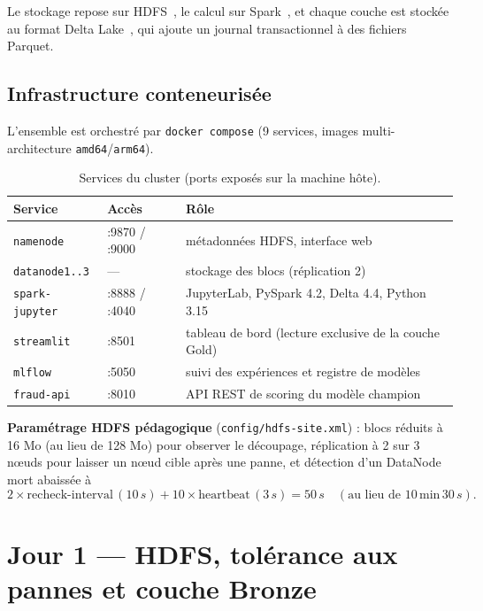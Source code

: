 \documentclass[11pt,a4paper]{article}
\newcommand{\code}[1]{\texttt{\small #1}}
\begin{document}
Le stockage repose sur HDFS~\cite{shvachko2010}, le calcul sur Spark~\cite{zaharia2012}, et chaque couche est stockée au format
Delta Lake~\cite{armbrust2020}, qui ajoute un journal transactionnel à des fichiers Parquet.

\subsection{Infrastructure conteneurisée}
L'ensemble est orchestré par \code{docker compose} (9 services, images multi-architecture \code{amd64}/\code{arm64}).

\begin{table}[H]
\centering\small
\begin{tabularx}{\linewidth}{@{}l l Y@{}}
\toprule
\textbf{Service} & \textbf{Accès} & \textbf{Rôle} \\ \midrule
\code{namenode} & :9870 / :9000 & métadonnées HDFS, interface web \\
\code{datanode1..3} & --- & stockage des blocs (réplication 2) \\
\code{spark-jupyter} & :8888 / :4040 & JupyterLab, PySpark 4.2, Delta 4.4, Python 3.15 \\
\code{streamlit} & :8501 & tableau de bord (lecture exclusive de la couche Gold) \\
\code{mlflow} & :5050 & suivi des expériences et registre de modèles \\
\code{fraud-api} & :8010 & API REST de scoring du modèle champion \\
\bottomrule
\end{tabularx}
\caption{Services du cluster (ports exposés sur la machine hôte).}
\end{table}

\textbf{Paramétrage HDFS pédagogique} (\code{config/hdfs-site.xml}) : blocs réduits à 16 Mo (au lieu de 128 Mo) pour observer le
découpage, réplication à 2 sur 3 nœuds pour laisser un nœud cible après une panne, et détection d'un DataNode mort abaissée à
\[ 2 \times \text{recheck-interval}\,(10\,s) + 10 \times \text{heartbeat}\,(3\,s) = 50\,s \quad (\text{au lieu de } 10\,\text{min}\,30\,s). \]

\section{Jour 1 — HDFS, tolérance aux pannes et couche Bronze}\label{sec:j1}
\end{document}
